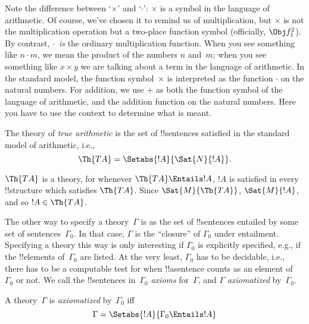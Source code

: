 \documentclass[../../../include/open-logic-section]{subfiles}
\begin{document}
Note the difference between `$\times$' and `$\cdot$': $\times$ is a
symbol in the language of arithmetic. Of course, we've chosen it to
remind us of multiplication, but $\times$ is not the multiplication
operation but a two-place function symbol (officially, $\Obj f^2_1$).
By contrast, $\cdot$~\emph{is} the ordinary multiplication function.
When you see something like $n \cdot m$, we mean the product of the
numbers $n$ and~$m$; when you see something like $x \times y$ we are
talking about a term in the language of arithmetic. In the standard
model, the function symbol~$\times$ is interpreted as the function
$\cdot$ on the natural numbers. For addition, we use $+$ as both the
function symbol of the language of arithmetic, and the addition
function on the natural numbers. Here you have to use the context to
determine what is meant.

\begin{defn}
The theory of \emph{true arithmetic} is the set of !!{sentence}s
satisfied in the standard model of arithmetic, i.e.,
\[
\Th{TA} = \Setabs{!A}{\Sat{N}{!A}}.
\]
\end{defn}

$\Th{TA}$ is a theory, for whenever $\Th{TA} \Entails !A$, $!A$ is
satisfied in every !!{structure} which satisfies $\Th{TA}$. Since
$\Sat{M}{\Th{TA}}$, $\Sat{M}{!A}$, and so $!A \in \Th{TA}$.

The other way to specify a theory~$\Gamma$ is as the set of
!!{sentence}s entailed by some set of sentences~$\Gamma_0$. In that
case, $\Gamma$ is the ``closure'' of $\Gamma_0$ under entailment.
Specifying a theory this way is only interesting if $\Gamma_0$ is
explicitly specified, e.g., if the !!{element}s of~$\Gamma_0$ are
listed. At the very least, $\Gamma_0$ has to be decidable, i.e., there
has to be a computable test for when !!a{sentence} counts as an
element of~$\Gamma_0$ or not. We call the !!{sentence}s
in~$\Gamma_0$ \emph{axioms} for~$\Gamma$, and $\Gamma$
\emph{axiomatized} by~$\Gamma_0$.

\begin{defn}
A theory~$\Gamma$ is \emph{axiomatized} by~$\Gamma_0$ iff
\[
\Gamma = \Setabs{!A}{\Gamma_0 \Entails !A}
\]
\end{defn}
\end{document}
